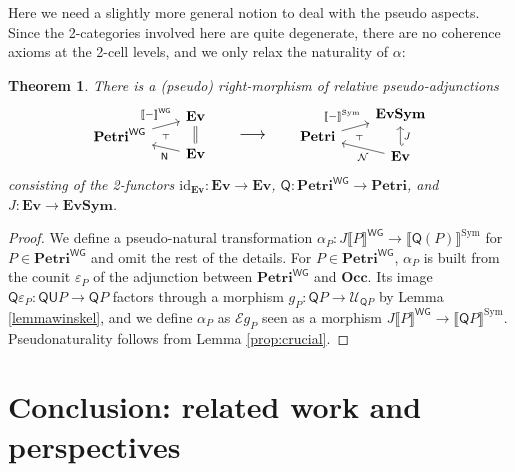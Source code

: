 \documentclass[11pt,a4paper]{article}
\theoremstyle{plain}
\newtheorem{theorem}{Theorem}[section]
\theoremstyle{definition}
\theoremstyle{remark}
\newcommand{\calN}{\mathcal{N}}
\newcommand{\calE}{\mathcal{E}}
\newcommand{\calU}{\mathcal{U}}
\newcommand{\Occ}{\mathbf{Occ}}
\newcommand{\Petri}{\mathbf{Petri}}
\newcommand{\WGPetri}{\mathbf{Petri}^{\mathsf{WG}}}
\newcommand{\ES}{\mathbf{Ev}}
\newcommand{\SES}{\mathbf{EvSym}}
\newcommand{\U}{\mathsf{U}}
\newcommand{\Q}{\mathsf{Q}}
\newcommand{\id}{\mathrm{id}}
\newcommand{\semWG}{\llbracket - \rrbracket^{\mathsf{WG}}}
\newcommand{\semWGA}[1]{\llbracket #1 \rrbracket^{\mathsf{WG}}}
\newcommand{\semS}{\llbracket - \rrbracket^{\mathrm{Sym}}}
\newcommand{\semSA}[1]{\llbracket #1 \rrbracket^{\mathrm{Sym}}}
\begin{document}
Here we need a slightly more general notion to deal with the pseudo aspects. Since the 2-categories involved here are quite degenerate, there are no coherence axioms at the 2-cell levels, and we only relax the naturality of $\alpha$:
\begin{theorem}
There is a (pseudo) right-morphism of relative pseudo-adjunctions 
\[\begin{tikzcd}[row sep=-0.2em, column sep=2em]
	& \ES \\
	\WGPetri \\
	& \ES
	\arrow[""{name=0, anchor=center, inner sep=0}, "{\semWG}"{pos=0.8}, from=2-1, to=1-2]
	\arrow[equals, from=3-2, to=1-2]
	\arrow[""{name=1, anchor=center, inner sep=0}, "\N"{pos=0.3}, from=3-2, to=2-1]
	\arrow["\dashv"{anchor=center, rotate=90}, draw=none, from=1, to=0]
\end{tikzcd}
\qquad 
\raisebox{-0.3em}{\scalebox{1.2}{$\longrightarrow$}}
\qquad 
\begin{tikzcd}[row sep=-0em, column sep=2em]
	& \SES \\
	\Petri \\
	& \ES
	\arrow[""{name=0, anchor=center, inner sep=0}, "\semS"{pos=0.8}, from=2-1, to=1-2]
	\arrow["J"', hook', from=3-2, to=1-2]
	\arrow[""{name=1, anchor=center, inner sep=0}, "\calN"{pos=0.3}, from=3-2, to=2-1]
	\arrow["\dashv"{anchor=center, rotate=91}, draw=none, from=1, to=0]
\end{tikzcd}
\]
consisting of the 2-functors $\id_{\ES}: \ES \to \ES$, $\Q : \WGPetri \to \Petri$, and $J : \ES \to \SES$.
\end{theorem}
\begin{proof}
We define a pseudo-natural transformation $\alpha_{P} : J \semWGA{P} \to \semSA{\Q(P)}$ for $P \in \WGPetri$ and omit the rest of the details.  For $P \in \WGPetri$, $\alpha_P$ is built from the counit $\varepsilon_P$ of the adjunction between $\WGPetri$ and $\Occ$. Its image $\Q\varepsilon_P : \Q\U P \rightarrow \Q P$ factors through a morphism $g_P : \Q P \rightarrow \calU_{\Q P}$   by Lemma \ref{lemmawinskel}, and we define $\alpha_P$ as $\calE g_P$ seen as a morphism $J\semWGA{P} \to \semSA{\Q P}$. Pseudonaturality follows from Lemma \ref{prop:crucial}.
\end{proof}


\section{Conclusion: related work and perspectives}
\end{document}
